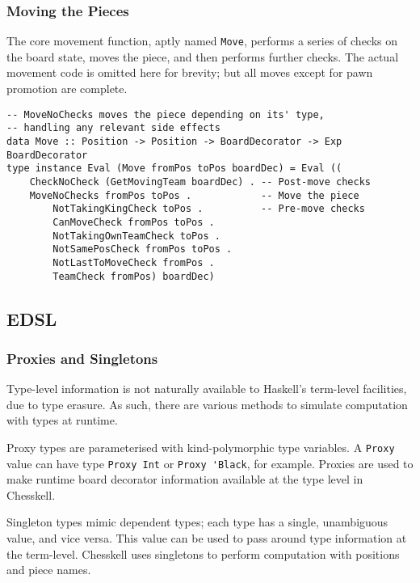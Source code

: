 \documentclass[12pt, a4paper]{scrartcl}
\begin{document}
\subsubsection{Moving the Pieces}

The core movement function, aptly named \lstinline{Move}, performs a series of checks on the board state, moves the piece, and then performs further checks. The actual movement code is omitted here for brevity; but all moves except for pawn promotion are complete.

\begin{lstlisting}
-- MoveNoChecks moves the piece depending on its' type,
-- handling any relevant side effects
data Move :: Position -> Position -> BoardDecorator -> Exp BoardDecorator
type instance Eval (Move fromPos toPos boardDec) = Eval ((
    CheckNoCheck (GetMovingTeam boardDec) . -- Post-move checks
    MoveNoChecks fromPos toPos .            -- Move the piece
        NotTakingKingCheck toPos .          -- Pre-move checks
        CanMoveCheck fromPos toPos .
        NotTakingOwnTeamCheck toPos .
        NotSamePosCheck fromPos toPos .
        NotLastToMoveCheck fromPos .
        TeamCheck fromPos) boardDec)
\end{lstlisting}

\subsection{EDSL}

\subsubsection{Proxies and Singletons}

Type-level information is not naturally available to Haskell's term-level facilities, due to type erasure. As such, there are various methods to simulate computation with types at runtime.

Proxy types are parameterised with kind-polymorphic type variables\cite{yorgey2012giving}. A \lstinline{Proxy} value can have type \lstinline{Proxy Int} or \lstinline{Proxy 'Black}, for example. Proxies are used to make runtime board decorator information available at the type level in Chesskell.

Singleton types mimic dependent types\cite{singletons}; each type has a single, unambiguous value, and vice versa. This value can be used to pass around type information at the term-level. Chesskell uses singletons to perform computation with positions and piece names.
\end{document}
